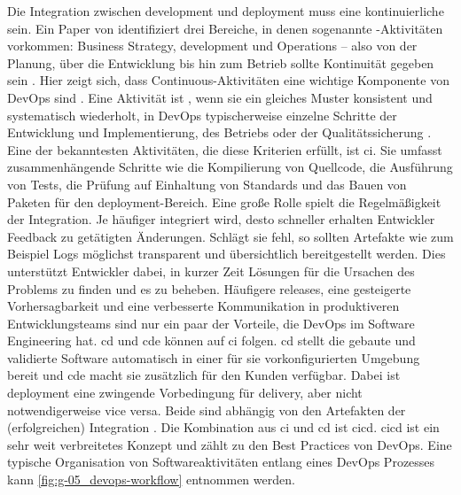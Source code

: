 Die Integration zwischen \Gls{development} und \Gls{deployment} muss eine kontinuierliche sein. Ein Paper von \citeauthor{005:Continuous-Software-Engineering-and-Beyond} identifiziert drei Bereiche, in denen sogenannte -Aktivitäten vorkommen: Business Strategy, \Gls{development} und Operations -- also von der Planung, über die Entwicklung bis hin zum Betrieb sollte Kontinuität gegeben sein \cite{005:Continuous-Software-Engineering-and-Beyond}. Hier zeigt sich, dass Continuous-Aktivitäten eine wichtige Komponente von DevOps sind \cite{000:CI-CD-Deployment-in-DevOps-reduce-Gap-Developer-Operation}. Eine Aktivität ist , wenn sie ein gleiches Muster konsistent und systematisch wiederholt, in DevOps typischerweise einzelne Schritte der Entwicklung und Implementierung, des Betriebs oder der Qualitätssicherung \cite{007:Analysis-of-Declarative-and-Pull-based-Deployment-Models-on-GitOps}. Eine der bekanntesten Aktivitäten, die diese Kriterien erfüllt, ist \acrfull{ci}. Sie umfasst zusammenhängende Schritte wie die Kompilierung von Quellcode, die Ausführung von Tests, die Prüfung auf Einhaltung von Standards und das Bauen von Paketen für den \Gls{deployment}-Bereich. Eine große Rolle spielt die Regelmäßigkeit der Integration. Je häufiger integriert wird, desto schneller erhalten Entwickler Feedback zu getätigten Änderungen. Schlägt sie fehl, so sollten Artefakte wie zum Beispiel Logs möglichst transparent und übersichtlich bereitgestellt werden. Dies unterstützt Entwickler dabei, in kurzer Zeit Lösungen für die Ursachen des Problems zu finden und es zu beheben. Häufigere \Glspl{release}, eine gesteigerte Vorhersagbarkeit und eine verbesserte Kommunikation in produktiveren Entwicklungsteams sind nur ein paar der Vorteile, die DevOps im Software Engineering hat. \acrfull{cd} und \acrfull{cde} können auf \Gls{ci} folgen. \acrshort{cd} stellt die gebaute und validierte Software automatisch in einer für sie vorkonfigurierten Umgebung bereit und \acrshort{cde} macht sie zusätzlich für den Kunden verfügbar. Dabei ist \Gls{deployment} eine zwingende Vorbedingung für \Gls{delivery}, aber nicht notwendigerweise vice versa. Beide sind abhängig von den Artefakten der (erfolgreichen) Integration \cite{005:Continuous-Software-Engineering-and-Beyond}. Die Kombination aus \Gls{ci} und \Gls{cd} ist \acrfull{cicd}. \Gls{cicd} ist ein sehr weit verbreitetes Konzept und zählt zu den Best Practices von DevOps. Eine typische Organisation von Softwareaktivitäten entlang eines DevOps Prozesses kann \autoref{fig:g-05_devops-workflow} entnommen werden.

